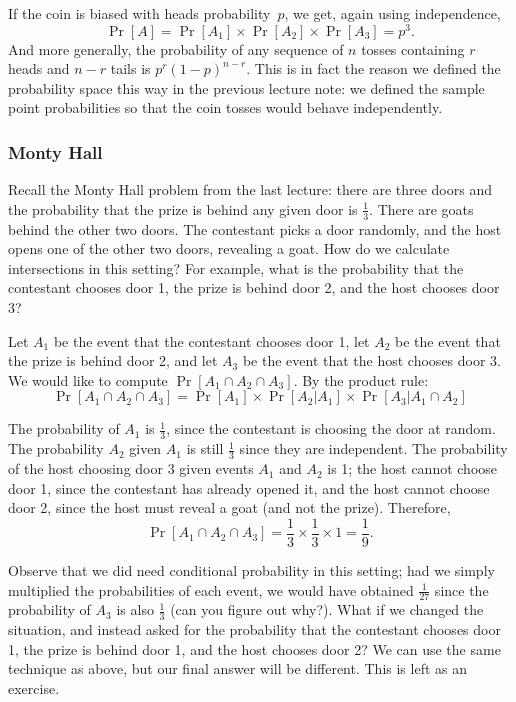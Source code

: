 \documentclass[11pt]{article}
\begin{document}
If the coin is biased with heads probability~$p$, we get, again using
independence, $$
   \Pr[A] = \Pr[A_1]\times \Pr[A_2]\times \Pr[A_3] = p^3.  $$
And more generally, the probability of any sequence of $n$ tosses
containing $r$ heads and $n-r$ tails is $p^r(1-p)^{n-r}$.  This is
in fact the reason we defined the probability space this way
in the previous lecture note: we defined the sample point probabilities
so that the coin tosses would behave independently.


\subsubsection*{Monty Hall}
Recall the Monty Hall problem from the last lecture: there are three doors 
and the probability that the prize is behind any given door is $\frac{1}{3}$. There
are goats behind the other two doors. 
The contestant picks a door randomly, and the host opens one of the other two doors,
revealing a goat. How do we calculate intersections in this setting? For example, what is 
the probability that the contestant chooses door 1, the prize is behind door 2, and the host chooses
door 3? 

Let $A_1$ be the event that the contestant chooses door 1, let $A_2$
be the event that the prize is behind door 2, and let $A_3$ be the event
that the host chooses door 3. We would like to compute $\Pr[A_1\cap A_2\cap A_3]$. 
By the product rule:
$$
\Pr[A_1\cap A_2\cap A_3] = \Pr[A_1]\times \Pr[A_2|A_1] \times \Pr[A_3|A_1\cap A_2]
$$

The probability of $A_1$ is $\frac{1}{3}$, since the contestant is choosing the door at random.
The probability $A_2$ given $A_1$ is still $\frac{1}{3}$ since they are independent. The probability of the host choosing
door 3 given events $A_1$ and $A_2$ is 1; the host cannot choose door 1, since the contestant has already opened it, and
the host cannot choose door 2, since the host must reveal a goat (and not the prize). 
Therefore, 
$$
\Pr[A_1\cap A_2\cap A_3] = \frac{1}{3}\times\frac{1}{3}\times 1 = \frac{1}{9}.
$$

Observe that we did need conditional probability in this setting; had we simply multiplied
the probabilities of each event, we would have obtained $\frac{1}{27}$ since the probability of $A_3$
is also $\frac{1}{3}$ (can you figure out why?). What if we changed the situation, and instead asked for the probability
that the contestant chooses door 1, the prize is behind door 1, and the host chooses door 2? We can use the same technique as above,
but our final answer will be different. This is left as an exercise.
\end{document}
